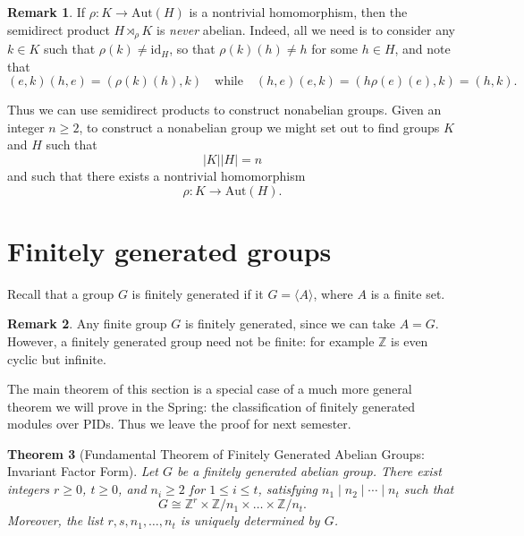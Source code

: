 \documentclass[12pt]{report}
\newtheorem{theorem}{Theorem}[chapter]
\numberwithin{equation}{section}
\numberwithin{theorem}{chapter}
\theoremstyle{definition}
\newtheorem*{basic properties}{Basic Properties}
\newtheorem*{Important Remark}{Important Remark}
\newtheorem{remark}[theorem]{Remark}
\def\sdp{\rtimes}
\begin{document}
\begin{remark}\label{semidirect product nonabliean}
If $\rho\!: K \longrightarrow \mathrm{Aut}(H)$ is a nontrivial homomorphism, then the semidirect product $H \sdp_\rho K$ is \emph{never} abelian. Indeed, all we need is to consider any $k \in K$ such that $\rho(k) \neq \mathrm{id}_H$, so that $\rho(k)(h) \neq h$ for some $h \in H$, and note that
$$(e,k)(h,e) = (\rho(k)(h),k) \quad \text{while} \quad (h,e)(e,k) = (h\rho(e)(e),k) = (h,k).$$
\end{remark}



Thus we can use semidirect products to construct nonabelian groups. 
Given an integer $n \geqslant 2$, to construct a nonabelian group we might set out to find groups $K$ and $H$ such that
$$|K| |H| = n$$
and such that there exists a nontrivial homomorphism
$$\rho\!: K \to \mathrm{Aut}(H).$$



\section{Finitely generated groups}


Recall that a group $G$ is finitely generated if it $G=\langle A \rangle$, where $A$ is a finite set. 

\begin{remark}
Any finite group $G$ is finitely generated, since we can take $A=G$. However, a finitely generated group need not be finite: for example $\mathbb{Z}$ is even cyclic but infinite.
\end{remark}

The main theorem of this section is a special case of a much more general theorem we will prove in the Spring: the classification of finitely generated modules over PIDs. Thus we leave the proof for next semester.

\begin{theorem}[Fundamental Theorem of Finitely Generated Abelian Groups: Invariant Factor Form]\label{finitely generated abelian groups invariant factors} 
Let $G$ be a finitely generated abelian group. There exist integers $r \geqslant 0$, $t \geqslant 0$, and $n_i \geqslant 2$ for $1 \leqslant i \leqslant t$, satisfying $n_1 \mid n_2 \mid \cdots \mid n_t$ such that 
  $$
  G \cong \mathbb{Z}^r \times \mathbb{Z}/n_1 \times \dots \times \mathbb{Z}/n_t.
  $$
  Moreover, the list $r,s,n_1,\ldots , n_t$ is uniquely determined by $G$.
\end{theorem}
\end{document}
